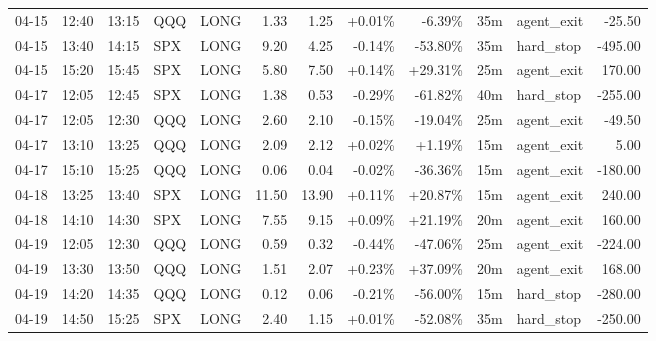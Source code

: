 \documentclass[11pt,a4paper]{article}
\begin{document}
\begin{center}
\begin{longtable}{>{\color{txtmain}}l l l l l r r r r r >{\color{txtmain}}l r}
04-15 & 12:40 & 13:15 & QQQ & LONG & 1.33 & 1.25 & \textcolor{wingreen}{+0.01\%} & \textcolor{lossred}{-6.39\%} & 35m & agent\_exit & \textcolor{lossred}{-25.50} \\
04-15 & 13:40 & 14:15 & SPX & LONG & 9.20 & 4.25 & \textcolor{lossred}{-0.14\%} & \textcolor{lossred}{-53.80\%} & 35m & hard\_stop & \textcolor{lossred}{-495.00} \\
04-15 & 15:20 & 15:45 & SPX & LONG & 5.80 & 7.50 & \textcolor{wingreen}{+0.14\%} & \textcolor{wingreen}{+29.31\%} & 25m & agent\_exit & \textcolor{wingreen}{170.00} \\
04-17 & 12:05 & 12:45 & SPX & LONG & 1.38 & 0.53 & \textcolor{lossred}{-0.29\%} & \textcolor{lossred}{-61.82\%} & 40m & hard\_stop & \textcolor{lossred}{-255.00} \\
04-17 & 12:05 & 12:30 & QQQ & LONG & 2.60 & 2.10 & \textcolor{lossred}{-0.15\%} & \textcolor{lossred}{-19.04\%} & 25m & agent\_exit & \textcolor{lossred}{-49.50} \\
04-17 & 13:10 & 13:25 & QQQ & LONG & 2.09 & 2.12 & \textcolor{wingreen}{+0.02\%} & \textcolor{wingreen}{+1.19\%} & 15m & agent\_exit & \textcolor{wingreen}{5.00} \\
04-17 & 15:10 & 15:25 & QQQ & LONG & 0.06 & 0.04 & \textcolor{lossred}{-0.02\%} & \textcolor{lossred}{-36.36\%} & 15m & agent\_exit & \textcolor{lossred}{-180.00} \\
04-18 & 13:25 & 13:40 & SPX & LONG & 11.50 & 13.90 & \textcolor{wingreen}{+0.11\%} & \textcolor{wingreen}{+20.87\%} & 15m & agent\_exit & \textcolor{wingreen}{240.00} \\
04-18 & 14:10 & 14:30 & SPX & LONG & 7.55 & 9.15 & \textcolor{wingreen}{+0.09\%} & \textcolor{wingreen}{+21.19\%} & 20m & agent\_exit & \textcolor{wingreen}{160.00} \\
04-19 & 12:05 & 12:30 & QQQ & LONG & 0.59 & 0.32 & \textcolor{lossred}{-0.44\%} & \textcolor{lossred}{-47.06\%} & 25m & agent\_exit & \textcolor{lossred}{-224.00} \\
04-19 & 13:30 & 13:50 & QQQ & LONG & 1.51 & 2.07 & \textcolor{wingreen}{+0.23\%} & \textcolor{wingreen}{+37.09\%} & 20m & agent\_exit & \textcolor{wingreen}{168.00} \\
04-19 & 14:20 & 14:35 & QQQ & LONG & 0.12 & 0.06 & \textcolor{lossred}{-0.21\%} & \textcolor{lossred}{-56.00\%} & 15m & hard\_stop & \textcolor{lossred}{-280.00} \\
04-19 & 14:50 & 15:25 & SPX & LONG & 2.40 & 1.15 & \textcolor{wingreen}{+0.01\%} & \textcolor{lossred}{-52.08\%} & 35m & hard\_stop & \textcolor{lossred}{-250.00} \\

\end{longtable}
\end{center}
\end{document}

